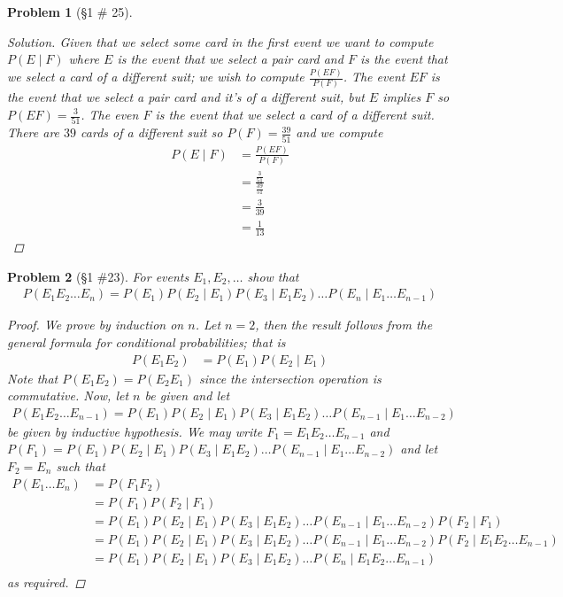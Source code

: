\documentclass[11pt, oneside]{book}   	%
\newtheorem{problem}{Problem}[chapter]
\begin{document}
\begin{spacing}{1.618}
\begin{problem}[\S 1 \# 25]
\begin{proof}[Solution]
		Given that we select some card in the first event we want to compute $P(E\mid F)$ where $E$ is the event that we select a pair card and $F$ is the event that we select a card of a different suit; we wish to compute $\frac{P(EF)}{P(F)}$. The event $EF$ is the event that we select a pair card and it's of a different suit, but $E$ implies $F$ so $P(EF)=\frac{3}{51}$. The even $F$ is the event that we select a card of a different suit. There are $39$ cards of a different suit so $P(F)=\frac{39}{51}$ and we compute
		\begin{alignat*}{4}
			P(E\mid F)&=\frac{P(EF)}{P(F)} \\
				&=\frac{\frac{3}{51}}{\frac{39}{51}} \\
				&=\frac{3}{39} \\
				&=\frac{1}{13}
		\end{alignat*}
	\end{proof}
\end{problem}

\begin{problem}[\S 1 \#23]\label{P1.23}
	For events $E_1, E_2, \dots$ show that 
	\begin{alignat}{4}
		P(E_1E_2\dots E_n)=P(E_1)P(E_2\mid E_1)P(E_3\mid E_1E_2)\dots P(E_n\mid E_1\dots E_{n-1})
	\end{alignat}
	\begin{proof}
		We prove by induction on $n$. Let $n=2$, then the result follows from the general formula for conditional probabilities; that is
		\begin{alignat*}{4}
			P(E_1E_2)&=P(E_1)P(E_2\mid E_1)
		\end{alignat*}
		Note that $P(E_1E_2)=P(E_2E_1)$ since the intersection operation is commutative. Now, let $n$ be given and let 
		\begin{alignat*}{4}
			P(E_1E_2\dots E_{n-1})=P(E_1)P(E_2\mid E_1)P(E_3\mid E_1E_2)\dots P(E_{n-1}\mid E_1\dots E_{n-2})
		\end{alignat*} 
		be given by inductive hypothesis. We may write $F_1=E_1E_2\dots E_{n-1}$ and $P(F_1)=P(E_1)P(E_2\mid E_1)P(E_3\mid E_1E_2)\dots P(E_{n-1}\mid E_1\dots E_{n-2})$ and let $F_2=E_n$ such that 
		\begin{alignat*}{4}
			P(E_1\dots E_n)&=P(F_1F_2) \\
				&=P(F_1)P(F_2\mid F_1) \\
				&=P(E_1)P(E_2\mid E_1)P(E_3\mid E_1E_2)\dots P(E_{n-1}\mid E_1\dots E_{n-2})P(F_2\mid F_1) \\
				&=P(E_1)P(E_2\mid E_1)P(E_3\mid E_1E_2)\dots P(E_{n-1}\mid E_1\dots E_{n-2})P(F_2\mid E_1E_2\dots E_{n-1}) \\
				&=P(E_1)P(E_2\mid E_1)P(E_3\mid E_1E_2)\dots P(E_n\mid E_1E_2\dots E_{n-1}) \\	
		\end{alignat*}
		as required. 
	\end{proof}
\end{problem}


\end{spacing}
\end{document}
